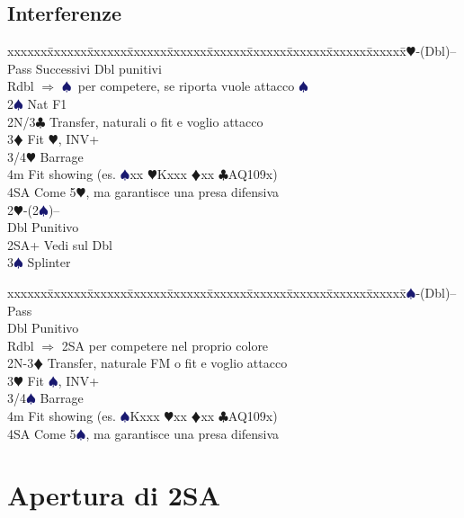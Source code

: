 \documentclass[a4paper,italian]{article}
\newcommand{\BC}{\textcolor{OliveGreen}{$\clubsuit$}}
\newcommand{\BD}{\textcolor{RedOrange}{$\vardiamondsuit$}}
\newcommand{\BH}{\textcolor{Red2}{$\varheartsuit${}}}
\newcommand{\BS}{\textcolor{MidnightBlue}{$\spadesuit${}}}
\newenvironment{bidtable}
{\begin{tabbing}

    xxxxxx\=xxxxxx\=xxxxxx\=xxxxxx\=xxxxxx\=xxxxxx\=xxxxxx\=xxxxxx\=xxxxxx\=xxxxxx\=\kill}
{\end{tabbing} }%
\begin{document}
\begin{multicols*}{2}
    \subsection{Interferenze}

    \begin{bidtable}
        2\BH-(Dbl)--\+\\
        Pass\> Successivi Dbl punitivi\\
        Rdbl\> $\Rightarrow$ \BS\ per competere, se riporta vuole attacco \BS\\
        2\BS\> Nat F1\\
        2N/3\BC\> Transfer, naturali o fit e voglio attacco\\
        3\BD\> Fit \BH, INV+\\
        3/4\BH\> Barrage\\
        4m\> Fit showing (es. \BS xx \BH Kxxx \BD xx \BC AQ109x)\\
        4SA\> Come 5\BH, ma garantisce una presa difensiva\-\\
        2\BH-(2\BS)--\+\\
        Dbl\> Punitivo\\
        2SA+\> Vedi sul Dbl\\
        3\BS\> Splinter\\
    \end{bidtable}

    \begin{bidtable}
        2\BS-(Dbl)--\+\\
        Pass\+\\
        Dbl\> Punitivo\-\\
        Rdbl\> $\Rightarrow$ 2SA per competere nel proprio colore\\
        2N-3\BD\> Transfer, naturale FM o fit e voglio attacco\\
        3\BH\> Fit \BS, INV+\\
        3/4\BS\> Barrage\\
        4m\> Fit showing (es. \BS Kxxx \BH xx \BD xx \BC AQ109x)\\
        4SA\> Come 5\BS, ma garantisce una presa difensiva\\
    \end{bidtable}

\end{multicols*}

\pagebreak

\section{Apertura di 2SA}
\end{document}
